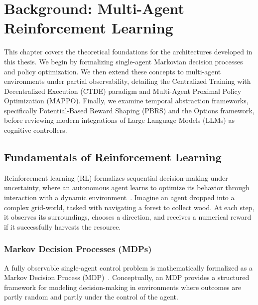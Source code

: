 \section{Background: Multi-Agent Reinforcement Learning}
\label{ch:background}

This chapter covers the theoretical foundations for the architectures developed in this thesis. We begin by formalizing single-agent Markovian decision processes and policy optimization. We then extend these concepts to multi-agent environments under partial observability, detailing the Centralized Training with Decentralized Execution (CTDE) paradigm and Multi-Agent Proximal Policy Optimization (MAPPO). Finally, we examine temporal abstraction frameworks, specifically Potential-Based Reward Shaping (PBRS) and the Options framework, before reviewing modern integrations of Large Language Models (LLMs) as cognitive controllers.

\subsection{Fundamentals of Reinforcement Learning}
\label{sec:rl_fundamentals}

Reinforcement learning (RL) formalizes sequential decision-making under uncertainty, where an autonomous agent learns to optimize its behavior through interaction with a dynamic environment~\parencite{Sutton_Barto_2018}. Imagine an agent dropped into a complex grid-world, tasked with navigating a forest to collect wood. At each step, it observes its surroundings, chooses a direction, and receives a numerical reward if it successfully harvests the resource.

\subsubsection{Markov Decision Processes (MDPs)}
\label{subsec:mdp}

A fully observable single-agent control problem is mathematically formalized as a Markov Decision Process (MDP)~\parencite{Szepesvári_2011}.
Conceptually, an MDP provides a structured framework for modeling decision-making in environments where outcomes are partly random and partly under the control of the agent. 

